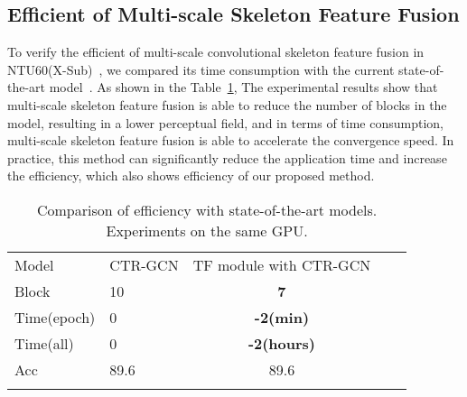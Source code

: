 \documentclass[letterpaper]{article} \usepackage[submission]{aaai23}  \usepackage{times}  \usepackage{helvet}  \usepackage{courier}  \usepackage[hyphens]{url}  \usepackage{graphicx} \urlstyle{rm} \def\UrlFont{\rm}  \usepackage{natbib}  \usepackage{caption} \frenchspacing  \setlength{\pdfpagewidth}{8.5in} \setlength{\pdfpageheight}{11in} \usepackage{algorithm}
\begin{document}
\subsection{Efficient of Multi-scale Skeleton Feature Fusion}
 To verify the efficient of multi-scale convolutional skeleton feature fusion in NTU60(X-Sub)~\cite{2016NTU}, we compared its time consumption with the current state-of-the-art model~\cite{2021Channel}. As shown in the Table~\ref{tab:111}, The experimental results show that multi-scale skeleton feature fusion is able to reduce the number of blocks in the model, resulting in a lower perceptual field, and in terms of time consumption, multi-scale skeleton feature fusion is able to accelerate the convergence speed. In practice, this method can significantly reduce the application time and increase the efficiency, which also shows efficiency of our proposed method.
 
\begin{table}[htp]
 \centering
\begin{tabular}{llccc}
\hline\noalign{\smallskip}
Model & CTR-GCN &TF module with CTR-GCN\\
\noalign{\smallskip}\hline\noalign{\smallskip}
Block&10&{\bf7}\\
Time(epoch)& 0&{\bf -2(min)}\\
Time(all)& 0&{\bf -2(hours)}\\
Acc&89.6&89.6\\



\noalign{\smallskip}\hline
\end{tabular}\caption{Comparison of efficiency with state-of-the-art models. Experiments on the same GPU.}
\label{tab:111}
\end{table}
\end{document}
